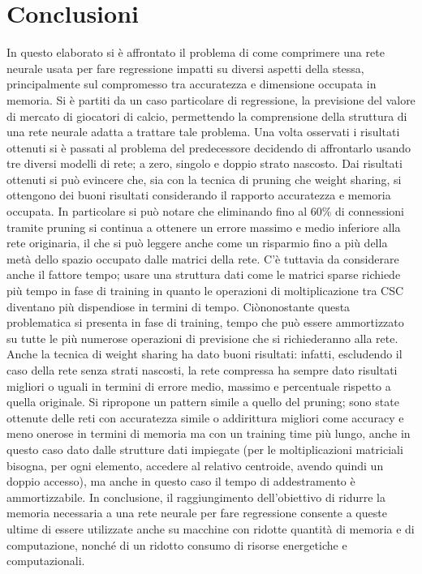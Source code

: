 \documentclass[12pt]{report}
\begin{document}
\chapter*{Conclusioni}
In questo elaborato si è affrontato il problema di come comprimere una rete neurale usata per fare regressione impatti su diversi aspetti della stessa, principalmente sul compromesso tra accuratezza e dimensione occupata in memoria. Si è partiti da un caso particolare di regressione, la previsione del valore di mercato di giocatori di calcio, permettendo la comprensione della struttura di una rete neurale adatta a trattare tale problema. Una volta osservati i risultati ottenuti si è passati al problema del predecessore decidendo di affrontarlo usando tre diversi modelli di rete; a zero, singolo e doppio strato nascosto. Dai risultati ottenuti si può evincere che, sia con la tecnica di pruning che weight sharing, si ottengono dei buoni risultati considerando il rapporto accuratezza e memoria occupata. In particolare si può notare che eliminando fino al 60\% di connessioni tramite pruning si continua a ottenere un errore massimo e medio inferiore alla rete originaria, il che si può leggere anche come un risparmio fino a più della metà dello spazio occupato dalle matrici della rete. C'è tuttavia da considerare anche il fattore tempo; usare una struttura dati come le matrici sparse richiede più tempo in fase di training in quanto le operazioni di moltiplicazione tra CSC diventano più dispendiose in termini di tempo. Ciònonostante questa problematica si presenta in fase di training, tempo che può essere ammortizzato su tutte le più numerose operazioni di previsione che si richiederanno alla rete.
Anche la tecnica di weight sharing ha dato buoni risultati: infatti, escludendo il caso della rete senza strati nascosti, la rete compressa ha sempre dato risultati migliori o uguali in termini di errore medio, massimo e percentuale rispetto a quella originale. Si ripropone un pattern simile a quello del pruning; sono state ottenute delle reti con accuratezza simile o addirittura migliori come accuracy e meno onerose in termini di memoria ma con un training time più lungo, anche in questo caso dato dalle strutture dati impiegate (per le moltiplicazioni matriciali bisogna, per ogni elemento, accedere al relativo centroide, avendo quindi un doppio accesso), ma anche in questo caso il tempo di addestramento è ammortizzabile.
In conclusione, il raggiungimento dell'obiettivo di ridurre la memoria necessaria a una rete neurale per fare regressione consente a queste ultime di essere utilizzate anche su macchine con ridotte quantità di memoria e di computazione, nonché di un ridotto consumo di risorse energetiche e computazionali. 

{}

\end{document}
